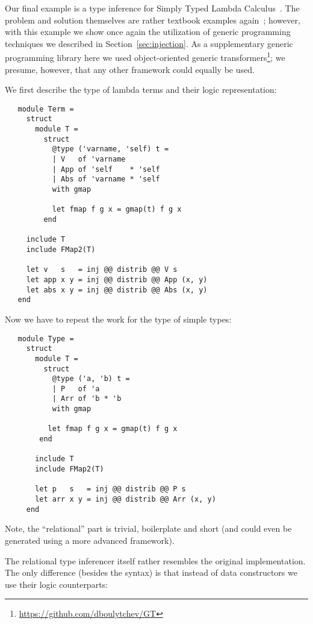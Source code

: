 Our final example is a type inference for Simply Typed Lambda Calculus~\cite{Lambda}. The problem and
solution themselves are rather textbook examples again~\cite{TRS, WillThesis}; however, with this example
we show once again the utilization of generic programming techniques we described in Section~\ref{sec:injection}.
As a supplementary generic programming library here we used object-oriented generic transformers\footnote{\url{https://github.com/dboulytchev/GT}};
we presume, however, that any other framework could equally be used.

We first describe the type of lambda terms and their logic representation:

\begin{lstlisting}
   module Term =
     struct
       module T =
         struct
           @type ('varname, 'self) t =
           | V   of 'varname
           | App of 'self    * 'self
           | Abs of 'varname * 'self
           with gmap

           let fmap f g x = gmap(t) f g x
         end

     include T
     include FMap2(T)

     let v   s   = inj @@ distrib @@ V s
     let app x y = inj @@ distrib @@ App (x, y)
     let abs x y = inj @@ distrib @@ Abs (x, y)
   end
\end{lstlisting}

Now we have to repeat the work for the type of simple types:

\begin{lstlisting}
   module Type =
     struct
       module T =
         struct
           @type ('a, 'b) t =
           | P   of 'a
           | Arr of 'b * 'b
           with gmap

          let fmap f g x = gmap(t) f g x
        end

       include T
       include FMap2(T)

       let p   s   = inj @@ distrib @@ P s
       let arr x y = inj @@ distrib @@ Arr (x, y)
     end
\end{lstlisting}

Note, the ``relational'' part is trivial, boilerplate and short (and could even be generated
using a more advanced framework).

The relational type inferencer itself rather resembles the original implementation. The only
difference (besides the syntax) is that instead of data constructors we use their logic
counterparts:

